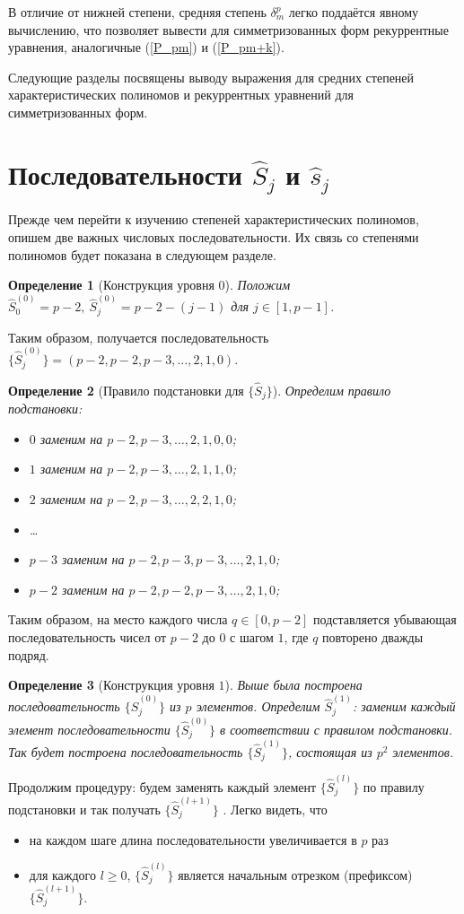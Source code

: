 \documentclass[14pt, a4paper, russian]{report}
\newtheorem{definition}{\indent Определение}
\begin{document}
В отличие от нижней степени, средняя степень $\delta_m^p$ легко поддаётся явному вычислению, что позволяет вывести для симметризованных форм рекуррентные уравнения, аналогичные (\ref{P_pm}) и (\ref{P_pm+k}).

Следующие разделы посвящены выводу выражения для средних степеней характеристических полиномов и рекуррентных уравнений для симметризованных форм.

\section{Последовательности $\hat{S}_j$ и $\hat{s}_j$}
Прежде чем перейти к изучению степеней характеристических полиномов, опишем две важных числовых последовательности. Их связь со степенями полиномов будет показана в следующем разделе.

\begin{definition}[Конструкция уровня $0$]
Положим $\hat{S}_0^{(0)} = p-2,\ \hat{S}_j^{(0)} = p-2-(j-1)$ для $j \in [1, p-1]$.
\end{definition}
Таким образом, получается последовательность $\{ \hat{S}_j^{(0)}\} = (p-2, p-2, p-3, \ldots, 2, 1, 0)$. 
\begin{definition} [Правило подстановки для $\{\hat{S}_j\}$]
Определим правило подстановки:
\begin{itemize}
 \item $0$ заменим на $p-2, p-3, \ldots, 2, 1, 0, 0$;
 \item $1$ заменим на $p-2, p-3, \ldots, 2, 1, 1, 0$;
 \item $2$ заменим на $p-2, p-3, \ldots, 2, 2, 1, 0$;
 \item \ldots
 \item $p-3$ заменим на $p-2, p-3, p-3, \ldots, 2, 1, 0$;
 \item $p-2$ заменим на $p-2, p-2, p-3, \ldots, 2, 1, 0$;
 \end{itemize}
\end{definition}
Таким образом, на место каждого числа $q \in [0, p-2]$ подставляется убывающая последовательность чисел от $p-2$ до $0$ с шагом $1$, где $q$ повторено дважды подряд.

\begin{definition}[Конструкция уровня $1$]\label{tier1}
Выше была построена последовательность $\{ \hat{S}_j^{(0)}\}$  из $p$ элементов. Определим 
$\hat{S}_j^{(1)}$: заменим каждый элемент последовательности $\{ \hat{S}_j^{(0)}\}$ в соответствии с правилом подстановки. Так будет построена последовательность $\{\hat{S}_j^{(1)}\}$, состоящая из $p^2$ элементов.
\end{definition}
Продолжим процедуру: будем заменять каждый элемент $\{ \hat{S}_j^{(l)}\}$ по правилу подстановки и так получать $\{ \hat{S}_j^{(l+1)}\}$ . Легко видеть, что
\begin{itemize}
\item на каждом шаге длина последовательности увеличивается в $p$ раз
\item для каждого $l \ge 0$,  $\{ \hat{S}_j^{(l)}\}$ является начальным отрезком (префиксом) $\{ \hat{S}_j^{(l+1)}\}$.
\end{itemize}
\end{document}
